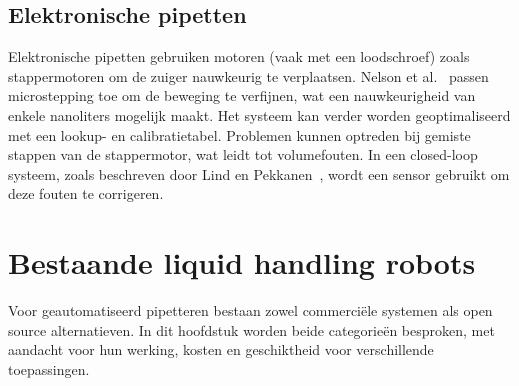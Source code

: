 \subsection{Elektronische pipetten}
Elektronische pipetten gebruiken motoren (vaak met een loodschroef) zoals stappermotoren om de zuiger nauwkeurig te verplaatsen. Nelson et al.\ \cite{RN35} passen microstepping toe om de beweging te verfijnen, wat een nauwkeurigheid van enkele nanoliters mogelijk maakt. Het systeem kan verder worden geoptimaliseerd met een lookup- en calibratietabel. Problemen kunnen optreden bij gemiste stappen van de stappermotor, wat leidt tot volumefouten. In een closed-loop systeem, zoals beschreven door Lind en Pekkanen\ \cite{RN36}, wordt een sensor gebruikt om deze fouten te corrigeren.

\section{Bestaande liquid handling robots}
Voor geautomatiseerd pipetteren bestaan zowel commerciële systemen als open source alternatieven. In dit hoofdstuk worden beide categorieën besproken, met aandacht voor hun werking, kosten en geschiktheid voor verschillende toepassingen.
